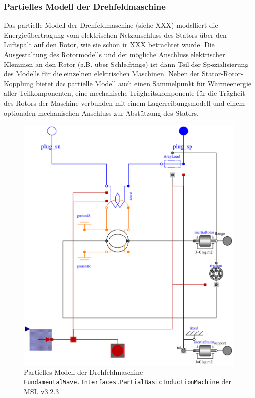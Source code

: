 \hypertarget{partielles-modell-der-drehfeldmaschine}{%
\subsubsection{Partielles Modell der
Drehfeldmaschine}\label{partielles-modell-der-drehfeldmaschine}}

Das partielle Modell der Drehfeldmaschine (siehe XXX) modelliert die
Energieübertragung vom elektrischen Netzanschluss des Stators über den
Luftspalt auf den Rotor, wie sie schon in XXX betrachtet wurde. Die
Ausgestaltung des Rotormodells und der mögliche Anschluss elektrischer
Klemmen an den Rotor (z.B. über Schleifringe) ist dann Teil der
Spezialisierung des Modells für die einzelnen elektrischen Maschinen.
Neben der Stator-Rotor-Kopplung bietet das partielle Modell auch einen
Sammelpunkt für Wärmeenergie aller Teilkomponenten, eine mechanische
Trägheitskomponente für die Trägheit des Rotors der Maschine verbunden
mit einem Lagerreibungsmodell und einem optionalen mechanischen
Anschluss zur Abstützung des Stators.

\begin{figure}
\centering
\includegraphics{Bilder/PartialBasicInductionMachine.pdf}
\caption{Partielles Modell der Drehfeldmaschine
\texttt{FundamentalWave.Interfaces.PartialBasicInductionMachine} der MSL
v3.2.3}
\end{figure}

